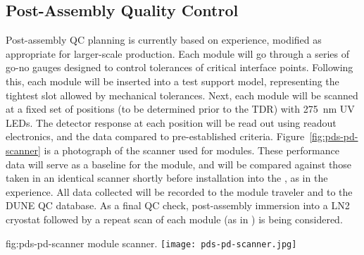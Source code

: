 


\subsection{Post-Assembly Quality Control}

Post-assembly QC planning is currently based on  experience, modified as appropriate for larger-scale production.  Each module will go through a series of go-no gauges designed to control tolerances of critical interface points.  Following this, each module will be inserted into a test  support model, representing the tightest slot allowed by  mechanical tolerances. Next, each module will be scanned at a fixed set of positions (to be determined prior to the TDR) with \SI{275}{nm} UV LEDs.  The detector response at each position will be read out using  readout electronics, and the data compared to pre-established criteria.  Figure~\ref{fig:pds-pd-scanner} is a photograph of the scanner used for  modules. These performance data will serve as a baseline for the module, and will be compared against those taken in an identical scanner shortly before installation into the , as in the  experience.  All data collected will be recorded to the module traveler and to the DUNE QC database.
As a final QC check, post-assembly immersion into a LN2 cryostat followed by a repeat scan of each  module (as in ) is being considered.

\begin{dunefigure}{fig:pds-pd-scanner}
{ module scanner.}
  \texttt{[image: pds-pd-scanner.jpg]}
\end{dunefigure}




